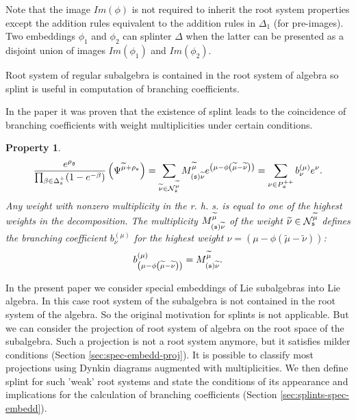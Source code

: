 \documentclass{article}
\newtheorem{Prop}[Def]{Property}
\begin{document}
Note that the image $Im(\phi)$ is not required to inherit the root system
properties except the addition rules equivalent to the addition
rules in $\Delta_{1}$ (for pre-images). Two embeddings $\phi_1$ and $\phi_2$  
can splinter $\Delta$  when the latter can be presented 
as a disjoint union of images $Im(\phi_1)$ and $Im(\phi_2)$. 

Root system of regular subalgebra is contained in the root system of algebra so splint is useful in
computation of branching coefficients. 

In the paper \cite{2011arXiv1111.6787L} it was proven that the existence of splint leads to the
coincidence of branching coefficients with weight multiplicities under certain conditions. 
\begin{Prop}
\begin{equation}
\frac{e^{\rho _{\frak{g}}}}{\prod_{\beta \in \Delta _{\frak{s}%
}^{+}}(1-e^{-\beta })}\left( \Psi ^{\widetilde{\mu }+\rho _{\frak{s}%
}}\right) =\sum_{\widetilde{\nu }\in \mathcal{N}_{\frak{s}}^{\widetilde{\mu }%
}}M_{\left( \frak{s}\right) \widetilde{\nu }}^{\widetilde{\mu }}e^{\left(
\mu -\phi \left( \widetilde{\mu }-\widetilde{\nu }\right) \right)
}=\sum_{\nu \in P_{\frak{a}}^{++}}b_{\nu }^{(\mu )}e^{\nu }.
\label{singular main-4}
\end{equation}
Any weight with nonzero multiplicity in the r. h. s. is equal to one of the
highest weights in the decomposition. The multiplicity $M_{\left( \frak{s}%
\right) \widetilde{\nu }}^{\widetilde{\mu }}$ of the weight  $\widetilde{\nu
}\in \mathcal{N}_{\frak{s}}^{\widetilde{\mu }}$ defines the branching
coefficient $b_{\nu }^{(\mu )}$ for the highest weight $\nu =\left( \mu
-\phi \left( \widetilde{\mu }-\widetilde{\nu }\right) \right) $:
\[
b_{\left( \mu -\phi \left( \widetilde{\mu }-\widetilde{\nu }\right) \right)
}^{(\mu )}=M_{\left( \frak{s}\right) \widetilde{\nu }}^{\widetilde{\mu }}.
\]
\end{Prop}


In the present paper we consider special embeddings of Lie subalgebras into Lie algebra. In this
case root system of the subalgebra is not contained in the root system of the algebra. So the
original motivation for splints is not applicable. But we can consider the projection of root system
of algebra on the root space of the subalgebra. Such a projection is not a root system anymore, but
it satisfies milder conditions (Section \ref{sec:spec-embedd-proj}). It is possible to classify most
projections using Dynkin diagrams augmented with multiplicities. We then define splint for such
'weak' root systems and state the conditions of its appearance and implications for the calculation
of branching coefficients (Section \ref{sec:splints-spec-embedd}).
\end{document}
